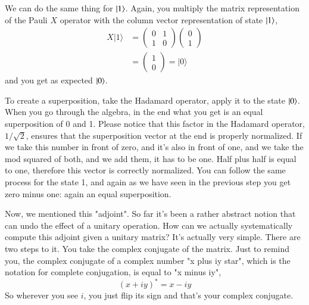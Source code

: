 We can do the same thing for $\ket{1}$. Again, you multiply the matrix representation of the Pauli $X$ operator with the column vector representation of state $\ket{1}$,
\begin{equation}
\begin{aligned}
X|1\rangle &=\left(\begin{array}{ll}
0 & 1 \\
1 & 0
\end{array}\right)\left(\begin{array}{l}
0 \\
1
\end{array}\right) \\
&=\left(\begin{array}{l}
1 \\
0
\end{array}\right)=|0\rangle
\end{aligned}
\end{equation}
and you get as expected $\ket{0}$. 

To create a superposition, take the Hadamard operator, apply it to the state $\ket{0}$. When you go through the algebra, in the end what you get is an equal superposition of 0 and 1. Please notice that this factor in the Hadamard operator, $1/\sqrt{2}$, ensures that the superposition vector at the end is properly normalized. If we take this number in front of zero, and it's also in front of one, and we take the mod squared of both, and we add them, it has to be one. Half plus half is equal to one, therefore this vector is correctly normalized. You can follow the same process for the state 1, and again as we have seen in the previous step you get zero minus one: again an equal superposition.

Now, we mentioned this "adjoint". So far it's been a rather abstract notion that can undo the effect of a unitary operation. How can we actually systematically compute this adjoint given a unitary matrix? It's actually very simple. There are two steps to it. You take the complex conjugate of the matrix. Just to remind you, the complex conjugate of a complex number "x plus iy star", which is the notation for complete conjugation, is equal to "x minus iy",
\begin{equation}
(x+i y)^{*}=x-i y
\end{equation}
 So wherever you see $i$, you just flip its sign and that's your complex conjugate.
 
